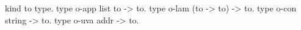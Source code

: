 \begin{elpicode}
  kind to type.
  type o-app list to -> to.
  type o-lam (to -> to) -> to.
  type o-con string -> to.
  type o-uva addr -> to.
\end{elpicode}
